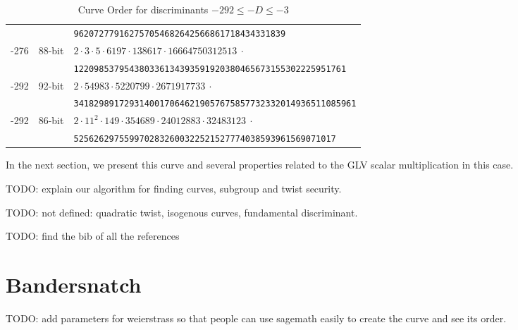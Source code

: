 \documentclass{amsart}
\newcommand{\SM}[1]{\color{blue}#1\color{black}}
\begin{document}
\begin{table*}[ht]
\begin{tabularx}{\textwidth}{ccl}
         			&   & \tt   962072779162757054682642566861718434331839\\  	
       	 -276 &  88-bit & \tt $  2 \cdot 3 \cdot 5 \cdot 6197 \cdot 138617 \cdot 16664750312513 ~\cdot  $  \\
         			&   & \tt  122098537954380336134393591920380465673155302225951761\\  	
       	 -292 &  92-bit & \tt $  2 \cdot  54983 \cdot  5220799 \cdot  2671917733 ~\cdot  $  \\
         			&   & \tt   34182989172931400170646219057675857732332014936511085961\\  	
       	 -292 &  86-bit & \tt $  2 \cdot 11^2 \cdot 149 \cdot 354689 \cdot 24012883 \cdot 32483123 ~\cdot  $  \\
         			&   & \tt  5256262975599702832600322521527774038593961569071017\\  	
        \bottomrule
    \end{tabularx}
    \caption{Curve Order for discriminants $-292 \leq -D \leq -3$ }
    \label{tab:group-order-factorization}
\end{table*}

In the next section, we present this curve and several properties
related to the  GLV scalar multiplication in this case.

\SM{TODO: explain our algorithm for finding curves, subgroup and twist
  security.}

\SM{TODO: not defined: quadratic twist, isogenous curves, fundamental
  discriminant.}

\SM{TODO: find the bib of all the references}

\section{Bandersnatch} 

\SM{TODO: add parameters for weierstrass so that people can use sagemath
  easily to create the curve and see its order.}
\end{document}
